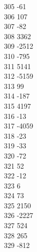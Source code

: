 { 305	-61 \\
 306	107 \\
 307	-82 \\
 308	3362 \\
 309	-2512 \\
 310	-795 \\
 311	5141 \\
 312	-5159 \\
 313	99 \\
 314	-187 \\
 315	4197 \\
 316	-13 \\
 317	-4059 \\
 318	-23 \\
 319	-33 \\
 320	-72 \\
 321	52 \\
 322	-12 \\
 323	6 \\
 324	73 \\
 325	2150 \\
 326	-2227 \\
 327	524 \\
 328	265 \\
 329	-812 \\
}
